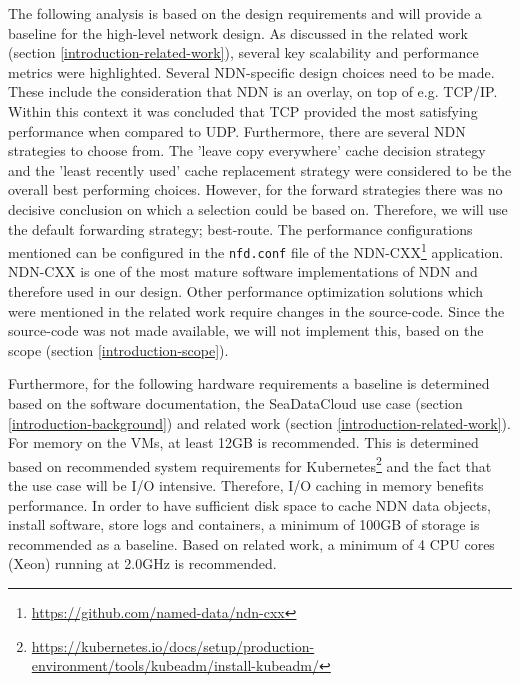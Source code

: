 The following analysis is based on the design requirements and will provide a baseline for the high-level network design. As discussed in the related work (section \ref{introduction-related-work}), several key scalability and performance metrics were highlighted. Several NDN-specific design choices need to be made. These include the consideration that NDN is an overlay, on top of e.g. TCP/IP. Within this context it was concluded that TCP provided the most satisfying performance when compared to UDP. Furthermore, there are several NDN strategies to choose from. The 'leave copy everywhere' cache decision strategy and the 'least recently used' cache replacement strategy were considered to be the overall best performing choices. However, for the forward strategies there was no decisive conclusion on which a selection could be based on. Therefore, we will use the default forwarding strategy; best-route. The performance configurations mentioned can be configured in the \texttt{nfd.conf} file of the NDN-CXX\footnote{\url{https://github.com/named-data/ndn-cxx}} application. NDN-CXX is one of the most mature software implementations of NDN and therefore used in our design. Other performance optimization solutions which were mentioned in the related work require changes in the source-code. Since the source-code was not made available, we will not implement this, based on the scope (section \ref{introduction-scope}).

Furthermore, for the following hardware requirements a baseline is determined based on the software documentation, the SeaDataCloud use case (section \ref{introduction-background}) and related work (section \ref{introduction-related-work}). For memory on the VMs, at least 12GB is recommended. This is determined based on recommended system requirements for Kubernetes\footnote{\url{https://kubernetes.io/docs/setup/production-environment/tools/kubeadm/install-kubeadm/}} and the fact that the use case will be I/O intensive. Therefore, I/O caching in memory benefits performance. In order to have sufficient disk space to cache NDN data objects, install software, store logs and containers, a minimum of 100GB of storage is recommended as a baseline. Based on related work, a minimum of 4 CPU cores (Xeon) running at 2.0GHz is recommended.

